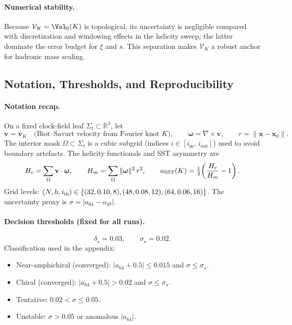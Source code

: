 \paragraph{Numerical stability.}
Because \(\mathcal{V}_K=\Vol_{\!\mathbb{H}}(K)\) is topological, its uncertainty is negligible compared with discretization and windowing effects in the helicity sweep; the latter dominate the error budget for \(\xi\) and \(s\). This separation makes \(\mathcal{V}_K\) a robust anchor for hadronic mass scaling.

\subsection*{Notation, Thresholds, and Reproducibility}
\label{sec:canon-notation}

\paragraph{Notation recap.}
On a fixed clock-field leaf \(\Sigma_t\subset\mathbb{R}^3\), let
\[
    \mathbf v = \mathbf v_K \quad\text{(Biot--Savart velocity from Fourier knot \(K\))},\qquad
    \boldsymbol\omega=\nabla\times\mathbf v,\qquad
    r=\|\mathbf x-\mathbf x_0\|.
\]
The interior mask \(\Omega\subset\Sigma_t\) is a cubic subgrid (indices \(i\in[i_\text{in},\,i_\text{out}]\)) used to avoid boundary artefacts. The helicity functionals and SST asymmetry are
\[
    H_c=\sum_{\Omega}\mathbf v\cdot\boldsymbol\omega,\qquad
    H_m=\sum_{\Omega}\|\boldsymbol\omega\|^2\, r^2,\qquad
    a_{\rm SST}(K)=\tfrac12\!\left(\frac{H_c}{H_m}-1\right).
\]
Grid levels: \((N,h,i_{\rm in})\in\{(32,0.10,8),(48,0.08,12),(64,0.06,16)\}\).
The uncertainty proxy is \(\sigma=|a_{64}-a_{48}|\).

\paragraph{Decision thresholds (fixed for all runs).}
\[
    \delta_\star=0.03,\qquad \sigma_\star=0.02.
\]
Classification used in the appendix:
\begin{itemize}
    \item Near-amphichiral (converged): \(|a_{64}+0.5|\le 0.015\) and \(\sigma\le\sigma_\star\).
    \item Chiral (converged): \(|a_{64}+0.5|> 0.02\) and \(\sigma\le\sigma_\star\).
    \item Tentative: \(0.02<\sigma\le 0.05\).
    \item Unstable: \(\sigma>0.05\) or anomalous \(|a_{64}|\).
\end{itemize}

